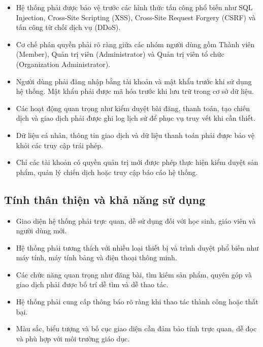 \documentclass[12pt,a4paper]{report}
\begin{document}
\begin{itemize}[label=--, leftmargin=1.2cm]
\item Hệ thống phải được bảo vệ trước các hình thức tấn công phổ biến như SQL Injection, Cross-Site Scripting (XSS), Cross-Site Request Forgery (CSRF) và tấn công từ chối dịch vụ (DDoS).


\item Cơ chế phân quyền phải rõ ràng giữa các nhóm người dùng gồm Thành viên (Member), Quản trị viên (Administrator) và Quản trị viên tổ chức (Organization Administrator).

\item Người dùng phải đăng nhập bằng tài khoản và mật khẩu trước khi sử dụng hệ thống. Mật khẩu phải được mã hóa trước khi lưu trữ trong cơ sở dữ liệu.

\item Các hoạt động quan trọng như kiểm duyệt bài đăng, thanh toán, tạo chiến dịch và giao dịch phải được ghi log lịch sử để phục vụ truy vết khi cần thiết.

\item Dữ liệu cá nhân, thông tin giao dịch và dữ liệu thanh toán phải được bảo vệ khỏi các truy cập trái phép.

\item Chỉ các tài khoản có quyền quản trị mới được phép thực hiện kiểm duyệt sản phẩm, quản lý chiến dịch hoặc truy cập báo cáo hệ thống.

\end{itemize}

\subsection{Tính thân thiện và khả năng sử dụng}

\begin{itemize}[label=--, leftmargin=1.2cm]
\item Giao diện hệ thống phải trực quan, dễ sử dụng đối với học sinh, giáo viên và người dùng mới.

\item Hệ thống phải tương thích với nhiều loại thiết bị và trình duyệt phổ biến như máy tính, máy tính bảng và điện thoại thông minh.

\item Các chức năng quan trọng như đăng bài, tìm kiếm sản phẩm, quyên góp và giao dịch phải được bố trí dễ tìm và dễ thao tác.

\item Hệ thống phải cung cấp thông báo rõ ràng khi thao tác thành công hoặc thất bại.

\item Màu sắc, biểu tượng và bố cục giao diện cần đảm bảo tính trực quan, dễ đọc và phù hợp với môi trường giáo dục.


\end{itemize}
\end{document}
